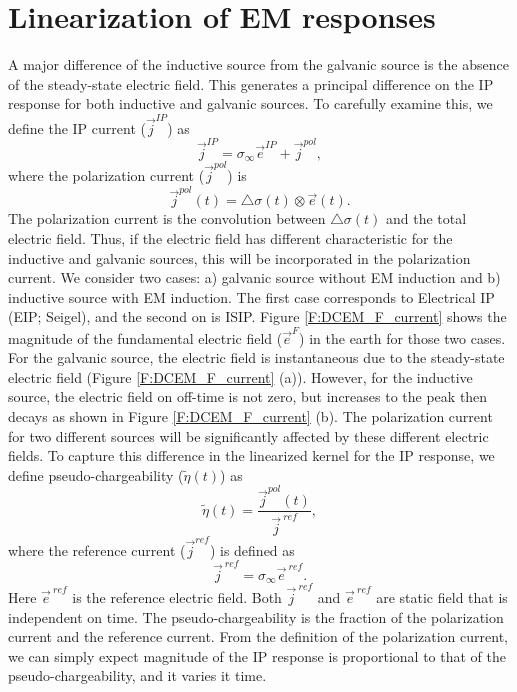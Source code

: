 \documentclass[a4paper, 11pt]{article}
\newcommand{\siginf}{\sigma_\infty}
\newcommand{\dsig}{\triangle\sigma}
\renewcommand {\j}  { {\vec j} }
\newcommand {\e}  { {\vec e} }
\newcommand{\peta}{\tilde{\eta}}
\newcommand{\eref}{\e^{\ ref}}
\begin{document}
\section{Linearization of EM responses}
A major difference of the inductive source from the galvanic source is the absence of the steady-state electric field. 
This generates a principal difference on the IP response for both inductive and galvanic sources. 
To carefully examine this, we define the IP current ($\j^{IP}$) as
\begin{equation}
  \j^{IP} = \siginf \e^{IP} + \j^{pol},
  \label{eq:IP_current}
\end{equation}
where the polarization current ($\j^{pol}$) is
\begin{equation}
  \j^{pol}(t) = \dsig(t) \otimes \e(t).
  \label{eq:polarization_current}
\end{equation}
The polarization current is the convolution between $\dsig (t)$ and the total electric field. 
Thus, if the electric field has different characteristic for the inductive and galvanic sources, this will be incorporated in the polarization current.
We consider two cases: a) galvanic source without EM induction and b) inductive source with EM induction. The first case corresponds to Electrical IP (EIP; Seigel), and the second on is ISIP.
Figure \ref{F:DCEM_F_current} shows the magnitude of the fundamental electric field ($\e^{F}$) in the earth for those two cases. 
For the galvanic source, the electric field is instantaneous due to the steady-state electric field (Figure \ref{F:DCEM_F_current} (a)). 
However, for the inductive source, the electric field on off-time is not zero, but increases to the peak then decays as shown in Figure \ref{F:DCEM_F_current} (b). 
The polarization current for two different sources will be significantly affected by these different electric fields. 
To capture this difference in the linearized kernel for the IP response, we define pseudo-chargeability ($\peta(t)$) as 
\begin{equation}
  \peta(t) = \frac{\j^{pol}(t)}{\j^{\ ref}},
  \label{eq:pseudochargeability_0}
\end{equation}
where the reference current ($\j^{ref}$) is defined as 
\begin{equation}
  \j^{\ ref} = \siginf \eref.
  \label{eq:reference_current}
\end{equation}
Here $\eref$ is the reference electric field. 
Both $\j^{\ ref}$ and $\eref$ are static field that is independent on time. 
The pseudo-chargeability is the fraction of the polarization current and the reference current. From the definition of the polarization current, we can simply expect magnitude of the IP response is proportional to that of the pseudo-chargeability, and it varies it time. 
\end{document}
